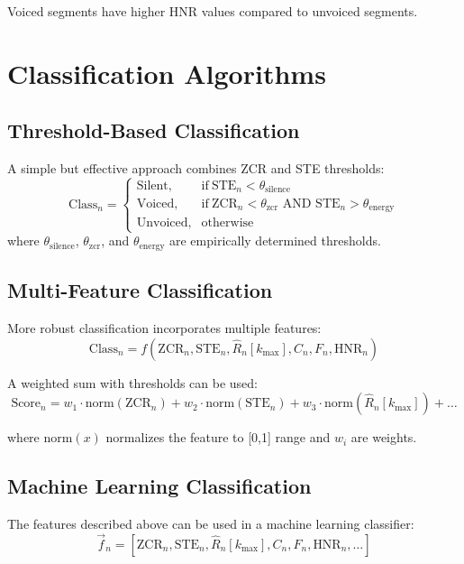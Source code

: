 \documentclass[10pt,journal,compsoc]{IEEEtran}
\begin{document}
Voiced segments have higher HNR values compared to unvoiced segments.

\section{Classification Algorithms}

\subsection{Threshold-Based Classification}
A simple but effective approach combines ZCR and STE thresholds:
\begin{equation}
\text{Class}_n = 
\begin{cases}
\text{Silent}, & \text{if}\ \text{STE}_n < \theta_{\text{silence}} \\
\text{Voiced}, & \text{if}\ \text{ZCR}_n < \theta_{\text{zcr}} \text{ AND } \text{STE}_n > \theta_{\text{energy}} \\
\text{Unvoiced}, & \text{otherwise}
\end{cases}
\end{equation}
where $\theta_{\text{silence}}$, $\theta_{\text{zcr}}$, and $\theta_{\text{energy}}$ are empirically determined thresholds.

\subsection{Multi-Feature Classification}
More robust classification incorporates multiple features:
\begin{equation}
\text{Class}_n = f(\text{ZCR}_n, \text{STE}_n, \hat{R}_n[k_{\text{max}}], C_n, F_n, \text{HNR}_n)
\end{equation}

A weighted sum with thresholds can be used:
\begin{equation}
\text{Score}_n = w_1 \cdot \text{norm}(\text{ZCR}_n) + w_2 \cdot \text{norm}(\text{STE}_n) + w_3 \cdot \text{norm}(\hat{R}_n[k_{\text{max}}]) + \ldots
\end{equation}

where $\text{norm}(x)$ normalizes the feature to [0,1] range and $w_i$ are weights.

\subsection{Machine Learning Classification}
The features described above can be used in a machine learning classifier:
\begin{equation}
\vec{f}_n = [\text{ZCR}_n, \text{STE}_n, \hat{R}_n[k_{\text{max}}], C_n, F_n, \text{HNR}_n, \ldots]
\end{equation}
\end{document}
